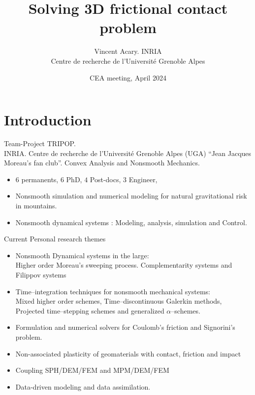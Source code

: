 \documentclass[8pt,red]{beamer}
\title{Solving  3D frictional contact problem}
\author{Vincent Acary. \quad INRIA \\ Centre de recherche de l'Université Grenoble Alpes}
\date{CEA meeting, April 2024}
\begin{document}




\section{Introduction}

\begin{frame}
  \begin{block}
    {Team-Project TRIPOP.\\ INRIA. Centre de recherche de l'Université Grenoble Alpes (UGA)}
    ``Jean Jacques Moreau's fan club''. Convex Analysis and Nonsmooth Mechanics.
    \begin{itemize}
    \item $6$ permanents, $6$ PhD, $4$ Post-docs, $3$ Engineer,
    \item Nonsmooth simulation and numerical modeling for natural gravitational risk in mountains.
    \item Nonsmooth dynamical systems :
      Modeling, analysis, simulation and Control.
    \end{itemize}
  \end{block}
    \begin{block}
      {Current Personal research themes}
    \begin{itemize}
    \item Nonsmooth Dynamical systems in the large:\\
      Higher order Moreau's sweeping process. Complementarity systems and Filippov systems
    \item Time--integration techniques for nonsmooth mechanical systems:\\ Mixed higher order schemes, Time--discontinuous Galerkin methods, Projected time--stepping schemes and generalized $\alpha$--schemes.
    \item Formulation and numerical solvers for Coulomb's friction and Signorini's problem.%
    \item Non-associated plasticity of geomaterials with contact, friction and impact
    \item Coupling SPH/DEM/FEM and MPM/DEM/FEM
    \item Data-driven modeling and data assimilation.
    \end{itemize}
  \end{block}
\end{frame}
\end{document}
